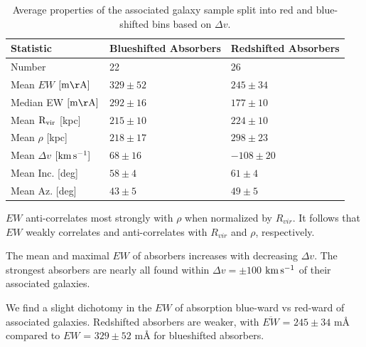 \documentclass[iop]{emulateapj-rtx4}
\begin{document}
\begin{table}[ht]\footnotesize
\begin{center}
\begin{tabular}{l l l}
 \hline \hline
 Statistic                				&  Blueshifted Absorbers   &     Redshifted Absorbers     \\ 
  \hline \hline
 Number 	          			 		&     	22				&	26			\\
 Mean $EW$    \scriptsize $\rm [m\AA]$    &	$329 \pm 52$ 		&	$245 \pm 34$  	\\
 Median EW     \scriptsize $\rm [m\AA]$    & 	$292 \pm 16$		& 	$177 \pm 10$	\\
 Mean $\rm R_{vir}$   \scriptsize [kpc]	&   	$215 \pm 10$		& 	$224 \pm 10$	\\
 Mean $\rho$   \scriptsize [kpc]          		&   	$218 \pm 17$ 		& 	$298 \pm 23$	\\
 Mean $\Delta v$  \scriptsize $\rm [km\, s^{-1}]$     &	$ 68 \pm 16$    &	$-108 \pm 20$	\\
 Mean Inc.  \scriptsize [deg]  			&  	$58 \pm 4$		&	$61 \pm 4$	\\
 Mean Az.  \scriptsize [deg]    			&	$43 \pm 5$ 		&	$49 \pm 5$ 	\\
   
\hline
\end{tabular}
\end{center}
  \caption{\small{Average properties of the associated galaxy sample split into red and blue-shifted bins based on $\Delta v$.}}
  \label{resultsTable}
\end{table}

\indent \textbullet \indent $EW$ anti-correlates most strongly with $\rho$ when normalized by $R_{vir}$. It follows that $EW$ weakly correlates and anti-correlates with $R_{vir}$ and $\rho$, respectively.

\indent \textbullet \indent The mean and maximal $EW$ of absorbers increases with decreasing $\Delta v$. The strongest absorbers are nearly all found within $\Delta v = \pm 100$ $\rm km\, s^{-1}$ of their associated galaxies.

\indent \textbullet \indent We find a slight dichotomy in the $EW$ of absorption blue-ward vs red-ward of associated galaxies. Redshifted absorbers are weaker, with $\overline{EW}$ = $245 \pm 34$ $\textrm{m\AA}$ compared to $EW$ = $329 \pm 52$ $\textrm{m\AA}$ for blueshifted absorbers.

\end{document}
